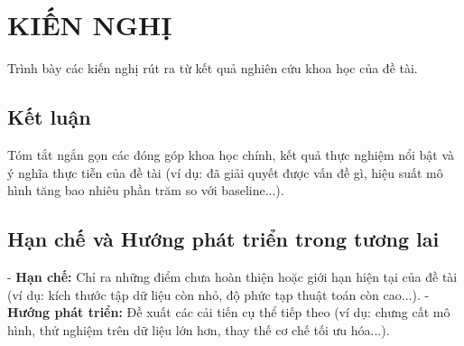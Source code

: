 \section{KIẾN NGHỊ}

Trình bày các kiến nghị rút ra từ kết quả nghiên cứu khoa học của đề tài.

\subsection{Kết luận}
Tóm tắt ngắn gọn các đóng góp khoa học chính, kết quả thực nghiệm nổi bật và ý nghĩa thực tiễn của đề tài (ví dụ: đã giải quyết được vấn đề gì, hiệu suất mô hình tăng bao nhiêu phần trăm so với baseline...).

\subsection{Hạn chế và Hướng phát triển trong tương lai}
- \textbf{Hạn chế:} Chỉ ra những điểm chưa hoàn thiện hoặc giới hạn hiện tại của đề tài (ví dụ: kích thước tập dữ liệu còn nhỏ, độ phức tạp thuật toán còn cao...).
- \textbf{Hướng phát triển:} Đề xuất các cải tiến cụ thể tiếp theo (ví dụ: chưng cất mô hình, thử nghiệm trên dữ liệu lớn hơn, thay thế cơ chế tối ưu hóa...).

\makesignatureblock
